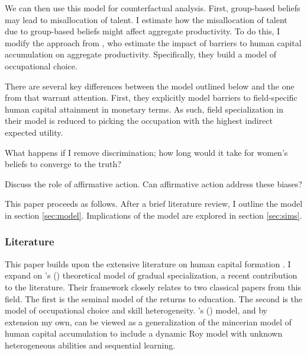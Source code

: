 \documentclass[11 pt]{article}
\newcommand{\toedit}[1]{{\color{gray}#1}}
\newcommand{\toedit}[1]{#1}
\newcommand{\citeposs}[1]{{\citeauthor{#1}'s (\citeyear{#1})}}
\begin{document}
\toedit{
We can then use this model for counterfactual analysis. 
First, group-based beliefs may lead to misallocation of talent.
I estimate how the misallocation of talent due to group-based beliefs might affect aggregate productivity. 
To do this, I modify the approach from \textcite{HHJK19}, who estimate the impact of barriers to human capital accumulation on aggregate productivity.
Specifically, they build a \textcite{R51} model of occupational choice.

There are several key differences between the model outlined below and the one from \textcite{HHJK19} that warrant attention.
%
First, they explicitly model barriers to field-specific human capital attainment in monetary terms. 
As such, field specialization in their model is reduced to picking the occupation with the highest indirect expected utility.
%
% 


} %

\toedit{
    What happens if I remove discrimination; how long would it take for women's beliefs to converge to the truth?
}

\toedit{
    Discuss the role of affirmative action. Can affirmative action address these biases?
}

This paper proceeds as follows. After a brief literature review, I outline the model in section \ref{sec:model}. Implications of the model are explored in section \ref{sec:sims}. 

\subsubsection*{Literature}

This paper builds upon the extensive literature on human capital formation \parencite{B62,B67,M74,R83}. 
I expand on \citeposs{AF20} theoretical model of gradual specialization, a recent contribution to the literature. 
Their framework closely relates to two classical papers from this field.
\toedit{The first is the seminal \textcite{M74} model of the returns to education. 
The second is the \textcite{R51} model of occupational choice and skill heterogeneity.
\citeposs{AF20} model, and by extension my own, can be viewed as a generalization of the mincerian model of human capital accumulation to include a dynamic Roy model with unknown heterogeneous abilities and sequential learning.}
\end{document}
